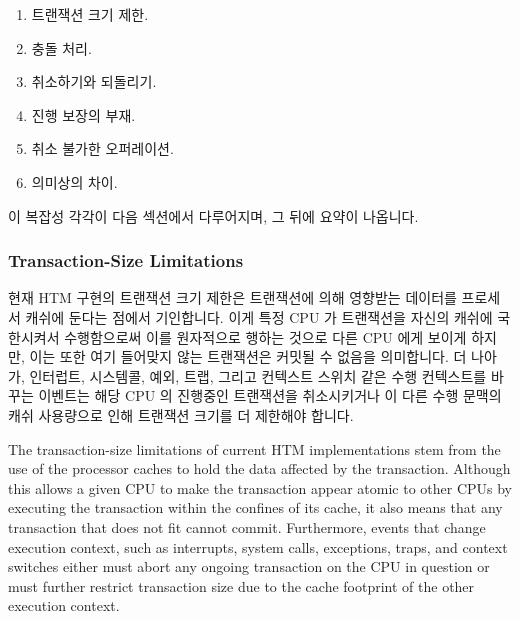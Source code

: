 \fi

\begin{enumerate}
\item	트랜잭션 크기 제한.
\item	충돌 처리.
\item	취소하기와 되돌리기.
\item	진행 보장의 부재.
\item	취소 불가한 오퍼레이션.
\item	의미상의 차이.

\iffalse

\item	Transaction-size limitations.
\item	Conflict handling.
\item	Aborts and rollbacks.
\item	Lack of forward-progress guarantees.
\item	Irrevocable operations.
\item	Semantic differences.

\fi

\end{enumerate}

이 복잡성 각각이 다음 섹션에서 다루어지며, 그 뒤에 요약이 나옵니다.

\iffalse

Each of these complications is covered in the following sections,
followed by a summary.

\fi

\subsubsection{Transaction-Size Limitations}
\label{sec:future:Transaction-Size Limitations}

현재 HTM 구현의 트랜잭션 크기 제한은 트랜잭션에 의해 영향받는 데이터를 프로세서
캐쉬에 둔다는 점에서 기인합니다.
이게 특정 CPU 가 트랜잭션을 자신의 캐쉬에 국한시켜서 수행함으로써 이를
원자적으로 행하는 것으로 다른 CPU 에게 보이게 하지만, 이는 또한 여기 들어맞지
않는 트랜잭션은 커밋될 수 없음을 의미합니다.
더 나아가, 인터럽트, 시스템콜, 예외, 트랩, 그리고 컨텍스트 스위치 같은 수행
컨텍스트를 바꾸는 이벤트는 해당 CPU 의 진행중인 트랜잭션을 취소시키거나 이 다른
수행 문맥의 캐쉬 사용량으로 인해 트랜잭션 크기를 더 제한해야 합니다.

\iffalse

The transaction-size limitations of current HTM implementations
stem from the use of the processor caches to hold the data
affected by the transaction.
Although this allows a given CPU to make the transaction appear atomic to
other CPUs by executing the transaction within the confines of its cache,
it also means that any transaction that does not fit cannot commit.
Furthermore, events that change execution context, such as interrupts,
system calls, exceptions, traps, and context switches either must
abort any ongoing transaction on the CPU in question or must further
restrict transaction size due to the cache footprint of the other
execution context.


